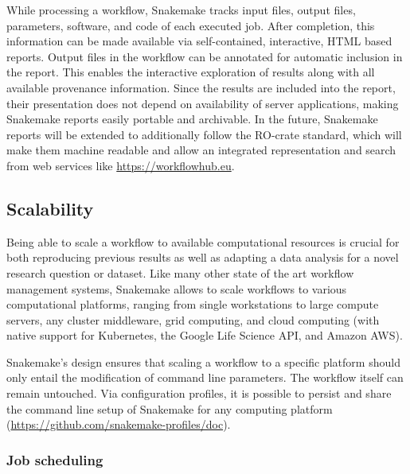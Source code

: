 \documentclass[parskip=half]{scrartcl}
\let\plainurl\url
\renewcommand{\url}[1]{\protect\plainurl{#1}}
\begin{document}
While processing a workflow, Snakemake tracks input files, output files, parameters, software, and code of each executed job.
After completion, this information can be made available via self-contained, interactive, HTML based reports.
Output files in the workflow can be annotated for automatic inclusion in the report.
This enables the interactive exploration of results along with all available provenance information.
Since the results are included into the report, their presentation does not depend on availability of server applications, making Snakemake reports easily portable and archivable.
In the future, Snakemake reports will be extended to additionally follow the RO-crate standard, which will make them machine readable and allow an integrated representation and search from web services like \url{https://workflowhub.eu}.

\subsection{Scalability}

Being able to scale a workflow to available computational resources is crucial for both reproducing previous results as well as adapting a data analysis for a novel research question or dataset.
Like many other state of the art workflow management systems, Snakemake allows to scale workflows to various computational platforms, ranging from single workstations to large compute servers, any cluster middleware, grid computing, and cloud computing (with native support for Kubernetes, the Google Life Science API, and Amazon AWS).

Snakemake's design ensures that scaling a workflow to a specific platform should only entail the modification of command line parameters.
The workflow itself can remain untouched.
Via configuration profiles, it is possible to persist and share the command line setup of Snakemake for any computing platform (\url{https://github.com/snakemake-profiles/doc}).

\subsubsection{Job scheduling}
\end{document}
